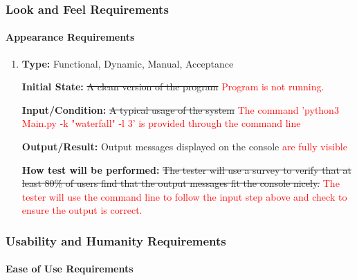 \documentclass[12pt, titlepage]{article}
\begin{document}
\subsubsection{Look and Feel Requirements}
\label{LaFReqs}
		
\paragraph{Appearance Requirements}

\begin{enumerate}[label=NFR-AR\arabic*:, wide=0pt, leftmargin=*]

\item \phantom{empty}

\textbf{Type:} Functional, Dynamic, Manual, Acceptance
					
\textbf{Initial State:} \sout{A clean version of the program} \textcolor{red}{Program is not running.}
					
\textbf{Input/Condition:} \sout{A typical usage of the system} 
\textcolor{red}{\textcolor{red}{The command 'python3 Main.py -k "waterfall" -l 3' is provided through the command line}}
					
\textbf{Output/Result:} Output messages displayed on the console \textcolor{red}{are fully visible}
					
\textbf{How test will be performed:} \sout{The tester will use a survey to verify that at least 80\% of users 
find that the output messages fit the console nicely.}
\textcolor{red}{The tester will use the command line to follow the input step above and check to ensure the output is correct.}

\end{enumerate}

\subsubsection{Usability and Humanity Requirements}
\label{UaHReqs}
		
\paragraph{Ease of Use Requirements}
\end{document}
